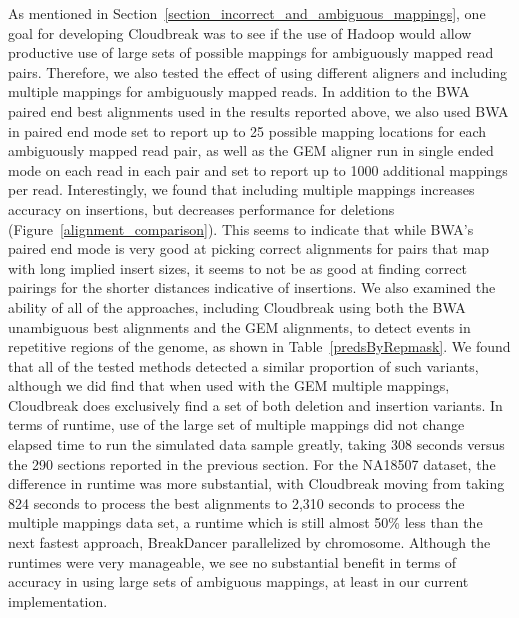 As mentioned in Section~\ref{section_incorrect_and_ambiguous_mappings}, one goal for developing Cloudbreak was to see if the use of Hadoop would allow productive use of large sets of possible mappings for ambiguously mapped read pairs. Therefore, we also tested the effect of using different aligners and including multiple mappings for ambiguously mapped reads. In addition to the BWA paired end best alignments used in the results reported above, we also used BWA in paired end mode set to report up to 25 possible mapping locations for each ambiguously mapped read pair, as well as the GEM aligner run in single ended mode on each read in each pair and set to report up to 1000 additional mappings per read. Interestingly, we found that including multiple mappings increases accuracy on insertions, but decreases performance for deletions (Figure~\ref{alignment_comparison}). This seems to indicate that while BWA's paired end mode is very good at picking correct alignments for pairs that map with long implied insert sizes, it seems to not be as good at finding correct pairings for the shorter distances indicative of insertions. We also examined the ability of all of the approaches, including Cloudbreak using both the BWA unambiguous best alignments and the GEM alignments, to detect events in repetitive regions of the genome, as shown in Table~\ref{predsByRepmask}. We found that all of the tested methods detected a similar proportion of such variants, although we did find that when used with the GEM multiple mappings, Cloudbreak does exclusively find a set of both deletion and insertion variants. In terms of runtime, use of the large set of multiple mappings did not change elapsed time to run the simulated data sample greatly, taking 308 seconds versus the 290 sections reported in the previous section. For the NA18507 dataset, the difference in runtime was more substantial, with Cloudbreak moving from taking 824 seconds to process the best alignments to 2,310 seconds to process the multiple mappings data set, a runtime which is still almost 50\% less than the next fastest approach, BreakDancer parallelized by chromosome. Although the runtimes were very manageable, we see no substantial benefit in terms of accuracy in using large sets of ambiguous mappings, at least in our current implementation.

